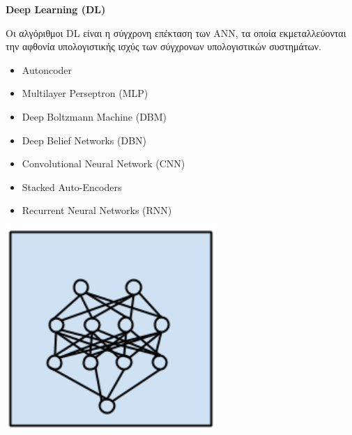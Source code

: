 \begin{minipage}{0.5\textwidth}

  \textbf{\large Deep Learning (DL)}

  Οι αλγόριθμοι DL είναι η σύγχρονη επέκταση των ANN, τα οποία
  εκμεταλλεύονται την αφθονία υπολογιστικής ισχύς των σύγχρονων υπολογιστικών συστημάτων.
  \begin{itemize}
    \setlength\itemsep{0em}
    \item{Autoncoder}
    \item{Multilayer Perseptron (MLP)}
    \item{Deep Boltzmann Machine (DBM)}
    \item{Deep Belief Networks (DBN)}
    \item{Convolutional Neural Network (CNN)}
    \item{Stacked Auto-Encoders}
    \item{Recurrent Neural Networks (RNN)}
  \end{itemize}%
\end{minipage}
\begin{minipage}{0.5\textwidth}
  \begin{center}
    \includegraphics[width=0.6\textwidth]{./images/chapter3/deep_learning_algorithms.png}
  \end{center}
\end{minipage}
\\\\

